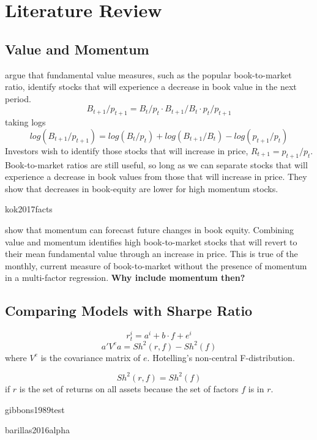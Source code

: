 
\section{Literature Review}

\subsection{Value and Momentum}

\textcite{kok2017facts} argue  that fundamental value measures, such as the popular 
book-to-market ratio, identify stocks that will experience a decrease in book value in the 
next period.
\[
B_{t+1}/p_{t+1} = B_t/p_t \cdot B_{t+1}/B_t \cdot p_t/p_{t+1}
\]
taking logs
\[
log(B_{t+1}/p_{t+1}) = log(B_{t}/p_{t}) + log(B_{t+1}/B_{t}) - log(p_{t+1}/p_{t})
\]
Investors wish to identify those stocks that will increase in price, $R_{t+1}=p_{t+1}/p_{t}$.
Book-to-market ratios are still useful, so long as we can separate stocks that will experience 
a decrease in book values from those that will increase in price.
They show that decreases in book-equity are lower for high momentum stocks.

{kok2017facts}

\textcite{asness2013devil} show that momentum can forecast future changes in book equity.
Combining value and momentum identifies high book-to-market stocks that will revert to their 
mean fundamental value through an increase in price.
This is true of the monthly, current measure of book-to-market without the presence of 
momentum in a multi-factor regression.
\textbf{Why include momentum then?}



\subsection{Comparing Models with Sharpe Ratio}

\textcite{gibbons1989test}
\[
r_t^i = a^i + b\cdot f + e^i
\]
\[
a'V^ea = Sh^2(r,f) - Sh^2(f)
\]
where $V^e$ is the covariance matrix of $e$.
Hotelling's non-central F-distribution.

\textcite{barillas2016alpha}
\[
Sh^2(r,f) = Sh^2(f)
\]
if $r$ is the set of returns on all assets because the set of factors $f$ is in $r$.

{gibbons1989test}

{barillas2016alpha}



